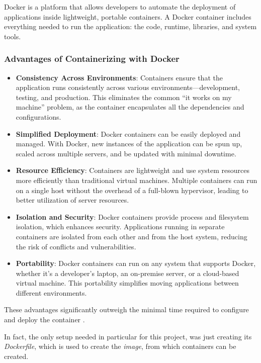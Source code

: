 Docker is a platform that allows developers to automate the deployment of applications inside 
lightweight, portable containers. A Docker container includes everything needed to run the 
application: the code, runtime, libraries, and system tools.

\subsubsection*{Advantages of Containerizing with Docker}

\begin{itemize}
    \item \textbf{Consistency Across Environments}: Containers ensure that the application runs 
    consistently across various environments—development, testing, and production. This eliminates 
    the common ``it works on my machine'' problem, as the container encapsulates all the 
    dependencies and configurations.
    \item \textbf{Simplified Deployment}: Docker containers can be easily deployed and managed. 
    With Docker, new instances of the application can be spun up, scaled across multiple servers, 
    and be updated with minimal downtime.
    \item \textbf{Resource Efficiency}: Containers are lightweight and use system resources more 
    efficiently than traditional virtual machines. Multiple containers can run on a single host 
    without the overhead of a full-blown hypervisor, leading to better utilization of server 
    resources.
    \item \textbf{Isolation and Security}: Docker containers provide process and filesystem 
    isolation, which enhances security. Applications running in separate containers are isolated 
    from each other and from the host system, reducing the risk of conflicts and vulnerabilities.
    \item \textbf{Portability}: Docker containers can run on any system that supports Docker, 
    whether it's a developer's laptop, an on-premise server, or a cloud-based virtual machine. 
    This portability simplifies moving applications between different environments.
\end{itemize}

These advantages significantly outweigh the minimal time required to configure and deploy the 
container \cite{docker_benefits2} \cite{docker_benefits}.

In fact, the only setup needed in particular for this project, was just creating its 
\textit{Dockerfile}, which is used to create the \textit{image}, from which containers can be 
created.


